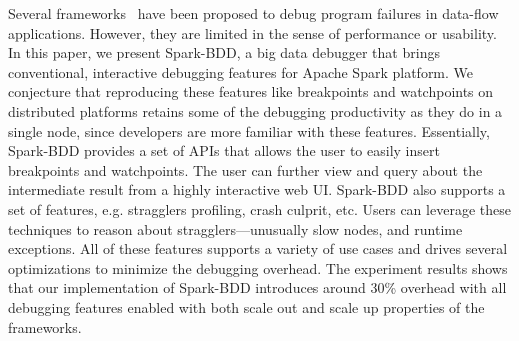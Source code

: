 \documentclass{acm_proc_article-sp}
\begin{document}
Several frameworks~\cite{olston2011inspector, jagannath2011monitoring, dave2013arthur} have been proposed to debug program failures in data-flow applications. However, they are limited in the sense of performance or usability. In this paper, we present Spark-BDD, a big data debugger that brings conventional, interactive debugging features for Apache Spark platform. We conjecture that reproducing these features like breakpoints and watchpoints on distributed platforms retains some of the debugging productivity as they do in a single node, since developers are more familiar with these features. Essentially, Spark-BDD provides a set of APIs that allows the user to easily insert breakpoints and watchpoints. The user can further view and query about the intermediate result from a highly interactive web UI. Spark-BDD also supports a set of features, e.g. stragglers profiling, crash culprit, etc. Users can leverage these techniques to reason about stragglers---unusually slow nodes, and runtime exceptions. All of these features supports a variety of use cases and drives several optimizations to minimize the debugging overhead. The experiment results shows that our implementation of Spark-BDD introduces around 30\% overhead with all debugging features enabled with both scale out and scale up properties of the frameworks.
\end{document}
